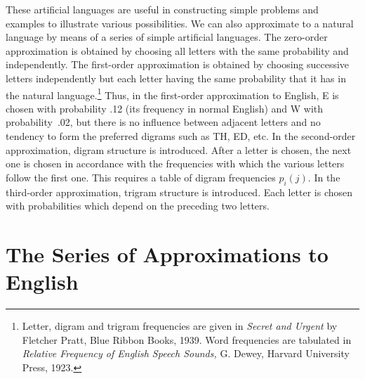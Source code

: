 These artificial languages are useful in constructing simple problems and
examples to illustrate various possibilities.  We can also approximate
to a natural language by means of a series of simple artificial
languages.  The zero-order approximation is obtained by choosing all
letters with the same probability and independently.  The first-order
approximation is obtained by choosing successive letters independently
but each letter having the same probability that it has in the natural
language.\footnote{Letter, digram and trigram frequencies are given in
{\it Secret and Urgent\/} by Fletcher Pratt, Blue Ribbon Books, 1939.
Word frequencies are tabulated in {\it Relative Frequency of English
Speech Sounds,} G. Dewey, Harvard University Press, 1923.} Thus, in the
first-order approximation to English, E is chosen with probability .12
(its frequency in normal English) and W with probability~.02, but there
is no influence between adjacent letters and no tendency to form the
preferred digrams such as TH, ED, etc.  In the second-order approximation,
digram structure is introduced.  After a letter is chosen, the next one is
chosen in accordance with the frequencies with which the various letters
follow the first one.  This requires a table of digram frequencies $p_i(j)$.
In the third-order approximation, trigram structure is introduced.  Each
letter is chosen with probabilities which depend on the preceding two
letters.

\section{The Series of Approximations to English}

